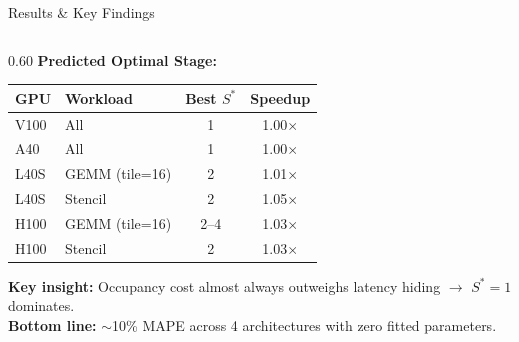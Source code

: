 \documentclass[aspectratio=169,10pt]{beamer}
\begin{document}
\begin{frame}{Results \& Key Findings}
\begin{columns}[T]
\begin{column}{0.60\textwidth}
\vspace{0.3em}
\textbf{Predicted Optimal Stage:}

\vspace{0.2em}
\renewcommand{\arraystretch}{1.15}
\begin{table}
\centering
\scriptsize
\begin{tabular}{@{}llcc@{}}
\toprule
\textbf{GPU} & \textbf{Workload} & \textbf{Best $S^*$} & \textbf{Speedup} \\
\midrule
\textcolor{gpuV100}{V100} & All & 1 & 1.00$\times$ \\
\textcolor{gpuA40}{A40}   & All & 1 & 1.00$\times$ \\
\textcolor{gpuL40S}{L40S}  & GEMM (tile=16) & 2 & 1.01$\times$ \\
\textcolor{gpuL40S}{L40S}  & Stencil & 2 & 1.05$\times$ \\
\textcolor{gpuH100}{H100}  & GEMM (tile=16) & 2--4 & 1.03$\times$ \\
\textcolor{gpuH100}{H100}  & Stencil & 2 & 1.03$\times$ \\
\bottomrule
\end{tabular}
\end{table}

\vspace{0.1em}
\centering\scriptsize
\textbf{Key insight:} Occupancy cost almost always outweighs latency hiding $\to$ $S^*{=}1$ dominates.\\[0.3em]
\small\textbf{Bottom line:} $\sim$10\% MAPE across 4 architectures with zero fitted parameters.
\end{column}
\end{columns}
\end{frame}
\end{document}
